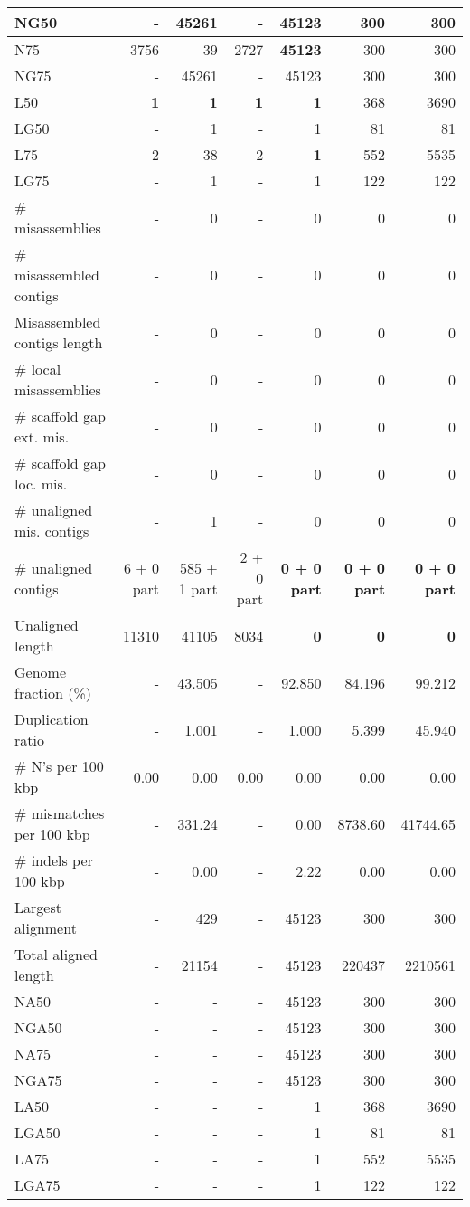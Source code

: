\documentclass[12pt,a4paper]{article}
\begin{document}
\begin{table}[ht]
\begin{center}
\begin{tabular}{|l*{6}{|r}|}
NG50 & - & 45261 & - & 45123 & 300 & 300 \\ \hline
N75 & 3756 & 39 & 2727 & {\bf 45123} & 300 & 300 \\ \hline
NG75 & - & 45261 & - & 45123 & 300 & 300 \\ \hline
L50 & {\bf 1} & {\bf 1} & {\bf 1} & {\bf 1} & 368 & 3690 \\ \hline
LG50 & - & 1 & - & 1 & 81 & 81 \\ \hline
L75 & 2 & 38 & 2 & {\bf 1} & 552 & 5535 \\ \hline
LG75 & - & 1 & - & 1 & 122 & 122 \\ \hline
\# misassemblies & - & 0 & - & 0 & 0 & 0 \\ \hline
\# misassembled contigs & - & 0 & - & 0 & 0 & 0 \\ \hline
Misassembled contigs length & - & 0 & - & 0 & 0 & 0 \\ \hline
\# local misassemblies & - & 0 & - & 0 & 0 & 0 \\ \hline
\# scaffold gap ext. mis. & - & 0 & - & 0 & 0 & 0 \\ \hline
\# scaffold gap loc. mis. & - & 0 & - & 0 & 0 & 0 \\ \hline
\# unaligned mis. contigs & - & 1 & - & 0 & 0 & 0 \\ \hline
\# unaligned contigs & 6 + 0 part & 585 + 1 part & 2 + 0 part & {\bf 0 + 0 part} & {\bf 0 + 0 part} & {\bf 0 + 0 part} \\ \hline
Unaligned length & 11310 & 41105 & 8034 & {\bf 0} & {\bf 0} & {\bf 0} \\ \hline
Genome fraction (\%) & - & 43.505 & - & 92.850 & 84.196 & 99.212 \\ \hline
Duplication ratio & - & 1.001 & - & 1.000 & 5.399 & 45.940 \\ \hline
\# N's per 100 kbp & 0.00 & 0.00 & 0.00 & 0.00 & 0.00 & 0.00 \\ \hline
\# mismatches per 100 kbp & - & 331.24 & - & 0.00 & 8738.60 & 41744.65 \\ \hline
\# indels per 100 kbp & - & 0.00 & - & 2.22 & 0.00 & 0.00 \\ \hline
Largest alignment & - & 429 & - & 45123 & 300 & 300 \\ \hline
Total aligned length & - & 21154 & - & 45123 & 220437 & 2210561 \\ \hline
NA50 & - & - & - & 45123 & 300 & 300 \\ \hline
NGA50 & - & - & - & 45123 & 300 & 300 \\ \hline
NA75 & - & - & - & 45123 & 300 & 300 \\ \hline
NGA75 & - & - & - & 45123 & 300 & 300 \\ \hline
LA50 & - & - & - & 1 & 368 & 3690 \\ \hline
LGA50 & - & - & - & 1 & 81 & 81 \\ \hline
LA75 & - & - & - & 1 & 552 & 5535 \\ \hline
LGA75 & - & - & - & 1 & 122 & 122 \\ \hline
\end{tabular}
\end{center}
\end{table}
\end{document}
